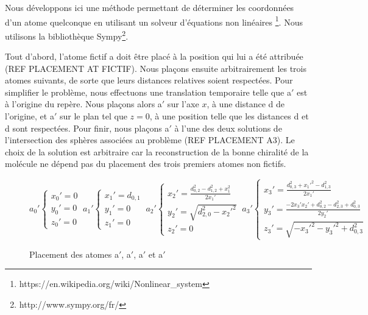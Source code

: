 \par Nous développons ici une méthode permettant de déterminer les coordonnées d'un atome quelconque en utilisant un solveur d'équations non linéaires \footnote{https://en.wikipedia.org/wiki/Nonlinear\_system}. Nous utilisons la bibliothèque Sympy\footnote{http://www.sympy.org/fr/}.\\

\par Tout d'abord, l'atome fictif a doit être placé à la position qui lui a été attribuée (REF PLACEMENT AT FICTIF). Nous plaçons ensuite arbitrairement les trois atomes suivants, de sorte que leurs distances relatives soient respectées. Pour simplifier le problème, nous effectuons une translation temporaire telle que a$'$ est à l'origine du repère. Nous plaçons alors a$'$ sur l'axe $x$, à une distance d de l'origine, et a$'$ sur le plan tel que $z=0$, à une position telle que les distances d et d sont respectées. Pour finir, nous plaçons a$'$ à l'une des deux solutions de l'intersection des sphères associées au problème (REF PLACEMENT A3). Le choix de la solution est arbitraire car la reconstruction de la bonne chiralité de la molécule ne dépend pas du placement des trois premiers atomes non fictifs.\\



\begin{figure}[!h]
	\centering
	
	\[
	a_{0}'\left \{
   	\begin{array}{l}
      x_{0}'=0\\
      y_{0}'=0\\
	  z_{0}'=0
   	\end{array}
   	\right .
   	\:
   	a_{1}'\left \{
   	\begin{array}{l}
      x_{1}'=d_{0,1}\\
      y_{1}'=0\\
	  z_{1}'=0
   	\end{array}
   	\right .
   	\:
	a_{2}'\left \{
   	\begin{array}{l}
      x_{2}'=\frac{d_{0,2}^2 - d_{1,2}^2 + x_{1}^2}{2x_{1}'}\\
      y_{2}'=\sqrt{d_{2,0}^2 - x_{2}'^2}\\
	  z_{2}'=0
   	\end{array}
   	\right .
   	\:
   	a_{3}'\left \{
   	\begin{array}{l}
      x_{3}'=\frac{d_{0,3}^2+x_1'^2-d_{1,3}^2}{2x_{1}'}\\
      y_{3}'=\frac{-2x_3'x_2'+d_{0,2}^2-d_{2,3}^2+d_{0,3}^2}{2y_2'}\\
	  z_{3}'=\sqrt{-x_3'^2-y_3'^2+d_{0,3}^2}
   	\end{array}
   	\right .
	\]
		
	\caption{Placement des atomes a$'$, a$'$, a$'$ et a$'$}
\end{figure}


